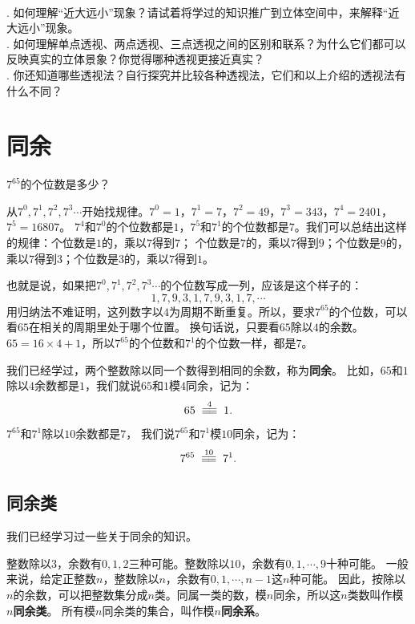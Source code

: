 \documentclass[12pt,UTF8,fontset=none]{ctexbook}
\begin{document}
\begin{sk}
    \mbox{}\\
    . 如何理解“近大远小”现象？请试着将学过的知识推广到立体空间中，来解释“近大远小”现象。\\
    . 如何理解单点透视、两点透视、三点透视之间的区别和联系？为什么它们都可以反映真实的立体景象？你觉得哪种透视更接近真实？\\
    . 你还知道哪些透视法？自行探究并比较各种透视法，它们和以上介绍的透视法有什么不同？
\end{sk}

\chapter{同余}
\begin{ex}\label{ex:3-0-0}
    $7^{65}$的个位数是多少？
\end{ex}
\begin{so}
    从$7^0,7^1,7^2,7^3\cdots$开始找规律。$7^0=1$，$7^1=7$，$7^2=49$，$7^3=343$，$7^4=2401$，$7^5=16807$。
    $7^4$和$7^0$的个位数都是$1$，$7^5$和$7^1$的个位数都是$7$。我们可以总结出这样的规律：个位数是$1$的，乘以$7$得到$7$；
    个位数是$7$的，乘以$7$得到$9$；个位数是$9$的，乘以$7$得到$3$；个位数是$3$的，乘以$7$得到$1$。

    也就是说，如果把$7^0,7^1,7^2,7^3\cdots$的个位数写成一列，应该是这个样子的：
    $$ 1, 7, 9, 3, 1, 7, 9, 3, 1, 7, \cdots$$
    用归纳法不难证明，这列数字以$4$为周期不断重复。所以，要求$7^{65}$的个位数，可以看$65$在相关的周期里处于哪个位置。
    换句话说，只要看$65$除以$4$的余数。$65 = 16 \times 4 + 1$，所以$7^{65}$的个位数和$7^1$的个位数一样，都是$7$。
\end{so}

我们已经学过，两个整数除以同一个数得到相同的余数，称为\textbf{同余}。
比如，$65$和$1$除以$4$余数都是$1$，我们就说$65$和$1$模$4$同余，记为：
$$ 65 \tong{4} 1. $$
$7^{65}$和$7^1$除以$10$余数都是$7$，
我们说$7^{65}$和$7^1$模$10$同余，记为：
$$ 7^{65} \tong{10} 7^1. $$  %

\section{同余类}
我们已经学习过一些关于同余的知识。

整数除以$3$，余数有$0,1,2$三种可能。整数除以$10$，余数有$0,1,\cdots , 9$十种可能。
一般来说，给定正整数$n$，整数除以$n$，余数有$0,1,\cdots , n-1$这$n$种可能。
因此，按除以$n$的余数，可以把整数集分成$n$类。同属一类的数，模$n$同余，所以这$n$类数叫作模$n$\textbf{同余类}。
所有模$n$同余类的集合，叫作模$n$\textbf{同余系}。
\end{document}
